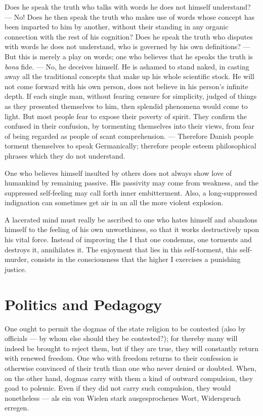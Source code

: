 \documentclass[12pt,a4paper]{article}
\newcommand{\opage}[1]{\marginnote{\footnotesize\textit{[#1]}}}
\newcommand{\aphsep}{\par\smallskip\centerline{\textasteriskcentered}\smallskip}
\begin{document}
\aphsep

Does he speak the truth who talks with words he does not himself understand? ---
No! Does he then speak the truth who makes use of words whose concept has been
imparted to him by another, without their standing in any organic connection with
the rest of his cognition? Does he speak the truth who disputes with words he does
not understand, who is governed by his own definitions? --- But this is merely a
play on words; one who believes that he speaks the truth is \emph{bona} fide. ---
No, he deceives himself. He is ashamed to stand naked, in casting away all the
traditional concepts that make up his whole scientific stock. He will not come
forward with his own person, does not believe in his person's infinite depth. If
each single man, without fearing censure for simplicity, judged of things as they
presented themselves to him, then splendid phenomena would come to light. But most
people fear \opage{51}to expose their poverty of spirit. They confirm the confused
in their confusion, by tormenting themselves into their views, from fear of being
regarded as people of scant comprehension. --- Therefore Danish people torment
themselves to speak Germanically; therefore people esteem philosophical phrases
which they do not understand.

\aphsep

One who believes himself insulted by others does not always show love of humankind
by remaining passive. His passivity may come from weakness, and the suppressed
self-feeling may call forth inner embitterment. Also, a long-suppressed
indignation can sometimes get air in an all the more violent explosion.

\aphsep

A lacerated mind must really be ascribed to one who hates himself and abandons
himself to the feeling of his own unworthiness, so that it works destructively upon
his vital force. Instead of improving the I that one condemns, one torments and
destroys it, annihilates it. The enjoyment that lies in this self-torment, this
self-murder, consists in the consciousness that the higher I exercises a punishing
justice.

\bigskip

\section*{Politics and Pedagogy}
\label{ch:011}

One ought to permit the dogmas of the state religion to be contested (also by
officials --- by whom else should they be contested?); for thereby many will
indeed be brought to reject them, but if they are true, they will constantly
return with renewed freedom. One who with freedom returns to their confession is
otherwise convinced of their truth than one who never denied or doubted. When, on
the other hand, dogmas carry with them a kind of outward compulsion, they goad to
polemic. Even if they did not carry such compulsion, they would nonetheless ---
als ein von Wielen stark ausgesprochenes Wort, Widerspruch erregen.
\end{document}
